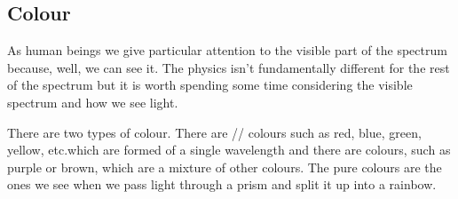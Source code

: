     \subsection{Colour}
    As human beings we give particular attention to the visible part of the spectrum because, well, we can see it.
    The physics isn't fundamentally different for the rest of the spectrum but it is worth spending some time considering the visible spectrum and how we see light.
    
    There are two types of colour.
    There are // colours such as red, blue, green, yellow, etc.\@ which are formed of a single wavelength and there are colours, such as purple or brown, which are a mixture of other colours.
    The pure colours are the ones we see when we pass light through a prism and split it up into a rainbow.
    
